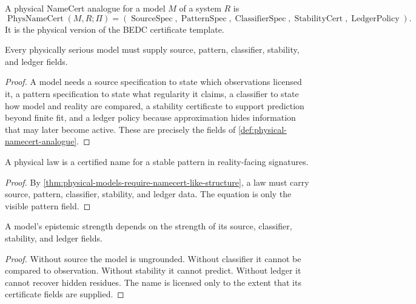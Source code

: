 \begin{definition}
\label{def:physical-namecert-analogue}
A physical NameCert analogue for a model $M$ of a system $R$ is
$$
\operatorname{PhysNameCert}(M,R;\Pi)
=
(\operatorname{SourceSpec},
\operatorname{PatternSpec},
\operatorname{ClassifierSpec},
\operatorname{StabilityCert},
\operatorname{LedgerPolicy}).
$$
It is the physical version of the BEDC certificate template.
\end{definition}

\begin{theorem}
\label{thm:physical-models-require-namecert-like-structure}
Every physically serious model must supply source, pattern, classifier, stability, and ledger fields.
\end{theorem}

\begin{proof}
A model needs a source specification to state which observations licensed it, a pattern specification to state what regularity it claims, a classifier to state how model and reality are compared, a stability certificate to support prediction beyond finite fit, and a ledger policy because approximation hides information that may later become active. These are precisely the fields of \autoref{def:physical-namecert-analogue}.
\end{proof}

\begin{corollary}
\label{cor:law-certified-name}
A physical law is a certified name for a stable pattern in reality-facing signatures.
\end{corollary}

\begin{proof}
By \autoref{thm:physical-models-require-namecert-like-structure}, a law must carry source, pattern, classifier, stability, and ledger data. The equation is only the visible pattern field.
\end{proof}

\begin{corollary}
\label{cor:model-name-certificate-bounded}
A model's epistemic strength depends on the strength of its source, classifier, stability, and ledger fields.
\end{corollary}

\begin{proof}
Without source the model is ungrounded. Without classifier it cannot be compared to observation. Without stability it cannot predict. Without ledger it cannot recover hidden residues. The name is licensed only to the extent that its certificate fields are supplied.
\end{proof}

